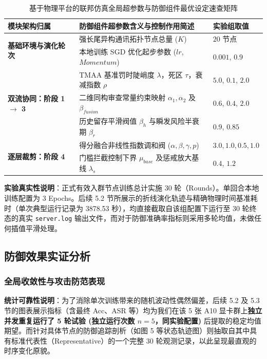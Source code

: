 \documentclass[runningheads]{llncs}
\begin{document}
\begin{table}[htbp]
\centering
\caption{基于物理平台的联邦仿真全局超参数与防御组件最优设定速查矩阵}
\label{tab:hyperparams}
\begin{tabular}{p{4cm} p{8.5cm} p{2cm}}
\toprule
\textbf{模块架构归属} & \textbf{防御组件超参数含义与控制作用简述} & \textbf{实验组取值} \\
\midrule
\multirow{2}{*}{\textbf{基础环境与演化轮次}} & 强长尾异构通讯拓扑节点总量 ($K$) & $20$ 节点 \\
& 本地训练 SGD 优化起步参数 ($lr$, $Momentum$) & $0.001$, $0.9$ \\
\midrule
\multirow{3}{*}{\textbf{双流协同：阶段 1 $\to$ 3}} & TMAA 基准罚时陡峭度 $\lambda$，死区 $\tau$，衰减指数 $\rho$ & $5.0$, $0.1$, $2.0$ \\
& 二维同构审查常量约束映射 $\alpha_1, \alpha_2$ 及 $\beta_{fusion}$ & $0.6$, $0.4$, $2.0$ \\
& 历史留存平滑阀值 $\beta_h$ 与瞬发风险半衰期 $\beta_r$ & $0.9$, $0.85$ \\
\midrule
\multirow{2}{*}{\textbf{逐层裁剪：阶段 4}} & 得分融合非线性指数调和阀 ($\alpha, \beta, \gamma, p$) & $3.0, 1.0, 0.5, 1.0$ \\
& 门槛拦截控制下界 $\mu_{base}$ 及惩戒放大基线 $\lambda_s$  & $0.4$, $1.2$ \\
\bottomrule
\end{tabular}
\end{table}

\textbf{实验真实性说明}：正式有效入群节点训练总计实施 $30$ 轮（Rounds）。单回合本地训练配置为 3 Epochs。后续 5.2 节所展示的折线演化轨迹与精确物理时间基准耗时（单次典型运行记录为 3878.53 秒），均直接截取自该组配置下运行至 30 轮终态的真实 \texttt{server.log} 输出文件，而对于防御准确率指标则采用多轮均值，未做任何插值平滑处理。

\subsection{防御效果实证分析}

\subsubsection{全局收敛性与攻击防范表现}
\textbf{统计可靠性说明}：为了消除单次训练带来的随机波动性偶然偏差，后续 5.2 及 5.3 节的图表展示指标（含最终 Acc、ASR 等）均为我们在该 5 张 A10 显卡群上\textbf{独立并发重复运行了 5 轮试验 (独立运行次数 $n=5$，同实验配置)} 后提取的稳定均值期望。而针对具体节点的防御追踪剖析（如图 5 等状态轨迹图）则抽取自其中具有标准代表性（Representative）的一个完整 30 轮观测记录，以此呈现最直观的时序变化原貌。
\end{document}
